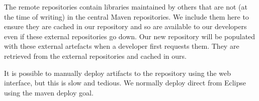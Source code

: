 The remote repositories contain libraries maintained by others that are not (at the time of writing) in the central Maven repositories.  We include them here to ensure they are cached in our repository and so are available to our developers even if these external repositories go down.  Our new repository will be populated with these external artefacts when a developer first requests them.  They are retrieved from the external repositories and cached in ours.

It is possible to manually deploy artifacts to the repository using the web interface, but this is slow and tedious.  We normally deploy direct from Eclipse using the maven deploy goal.  






